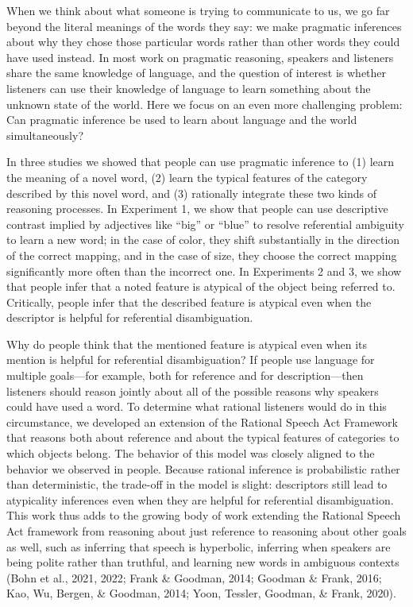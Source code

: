 \documentclass[
  english,
  man,floatsintext]{apa6}
\begin{document}
When we think about what someone is trying to communicate to us, we go far beyond the literal meanings of the words they say: we make pragmatic inferences about why they chose those particular words rather than other words they could have used instead. In most work on pragmatic reasoning, speakers and listeners share the same knowledge of language, and the question of interest is whether listeners can use their knowledge of language to learn something about the unknown state of the world. Here we focus on an even more challenging problem: Can pragmatic inference be used to learn about language and the world simultaneously?

In three studies we showed that people can use pragmatic inference to (1) learn the meaning of a novel word, (2) learn the typical features of the category described by this novel word, and (3) rationally integrate these two kinds of reasoning processes. In Experiment 1, we show that people can use descriptive contrast implied by adjectives like ``big'' or ``blue'' to resolve referential ambiguity to learn a new word; in the case of color, they shift substantially in the direction of the correct mapping, and in the case of size, they choose the correct mapping significantly more often than the incorrect one. In Experiments 2 and 3, we show that people infer that a noted feature is atypical of the object being referred to. Critically, people infer that the described feature is atypical even when the descriptor is helpful for referential disambiguation.

Why do people think that the mentioned feature is atypical even when its mention is helpful for referential disambiguation? If people use language for multiple goals---for example, both for reference and for description---then listeners should reason jointly about all of the possible reasons why speakers could have used a word. To determine what rational listeners would do in this circumstance, we developed an extension of the Rational Speech Act Framework that reasons both about reference and about the typical features of categories to which objects belong. The behavior of this model was closely aligned to the behavior we observed in people. Because rational inference is probabilistic rather than deterministic, the trade-off in the model is slight: descriptors still lead to atypicality inferences even when they are helpful for referential disambiguation. This work thus adds to the growing body of work extending the Rational Speech Act framework from reasoning about just reference to reasoning about other goals as well, such as inferring that speech is hyperbolic, inferring when speakers are being polite rather than truthful, and learning new words in ambiguous contexts (Bohn et al., 2021, 2022; Frank \& Goodman, 2014; Goodman \& Frank, 2016; Kao, Wu, Bergen, \& Goodman, 2014; Yoon, Tessler, Goodman, \& Frank, 2020).
\end{document}
